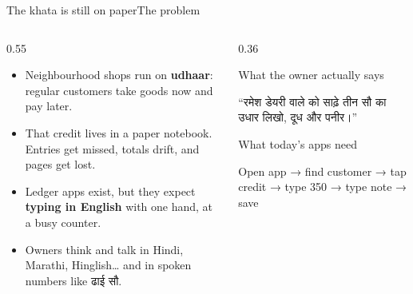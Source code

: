 \documentclass[aspectratio=169,10pt]{beamer}
\newcommand{\lbl}[1]{{\color{muted}\footnotesize #1}}
\begin{document}
\begin{frame}{The khata is still on paper}{The problem}
  \begin{columns}[T]
    \begin{column}{0.55\textwidth}
      \begin{itemize}\setlength{\itemsep}{6pt}\small
        \item Neighbourhood shops run on \textbf{udhaar}: regular customers take goods now and pay later.
        \item That credit lives in a paper notebook. Entries get missed, totals drift, and pages get lost.
        \item Ledger apps exist, but they expect \textbf{typing in English} with one hand, at a busy counter.
        \item Owners think and talk in Hindi, Marathi, Hinglish… and in spoken numbers like {\deva ढाई सौ}.
      \end{itemize}
    \end{column}
    \begin{column}{0.36\textwidth}
      \begin{appcard}
        {\lbl{What the owner actually says}}\par\vspace{6pt}
        {\deva “रमेश डेयरी वाले को साढ़े तीन सौ का उधार लिखो, दूध और पनीर।”}\par\vspace{8pt}
        {\lbl{What today's apps need}}\par\vspace{2pt}
        {\small Open app → find customer → tap credit → type 350 → type note → save}
      \end{appcard}
    \end{column}
  \end{columns}
\end{frame}
\end{document}
